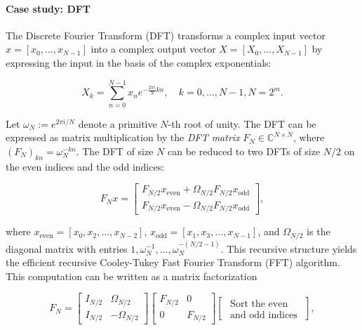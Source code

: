 \paragraph{Case study: DFT} The Discrete Fourier Transform (DFT) transforms a complex input vector $x = [x_0, \dots, x_{N-1}]$ into a complex output vector $X = [X_0, \dots, X_{N-1}]$ by expressing the input in the basis of the complex exponentials:

\begin{equation*}
  X_{k} = \sum_{n=0}^{N-1} x_n e^{-\frac{2\pi i}{N}kn}, \quad k = 0, \dots, N-1, N = 2^m.
\end{equation*}

Let $\omega_N := e^{2\pi i/N}$ denote a primitive $N$-th root of unity. The DFT can be expressed as matrix multiplication by the \emph{DFT matrix} $F_N \in \mathbb{C}^{N \times N}$, where $(F_N)_{kn} = \omega_N^{-kn}$. 
The DFT of size $N$ can be reduced to two DFTs of size $N/2$ on the even indices and the odd indices:

\begin{equation*}
  F_N x = \begin{bmatrix} F_{N/2} x_{\mathrm{even}} + \Omega_{N/2} F_{N/2} x_{\mathrm{odd}} \\ F_{N/2} x_{\mathrm{even}} - \Omega_{N/2} F_{N/2} x_{\mathrm{odd}} \end{bmatrix},
\end{equation*}

where $x_{\mathrm{even}} = \left[ x_0, x_2, \dots, x_{N-2} \right]$,
$x_{\mathrm{odd}} = \left[ x_1, x_3, \dots, x_{N-1} \right]$, and $\Omega_{N/2}$ is the diagonal matrix with entries $1, \omega_N^{-1}, \dots, \omega_N^{-(N/2 - 1)}$. This recursive structure yields the efficient recursive Cooley-Tukey Fast Fourier Transform (FFT) algorithm. This computation can be written as a matrix factorization

\begin{equation*}
  F_N = \begin{bmatrix} I_{N/2} & \Omega_{N/2} \\ I_{N/2} & -\Omega_{N/2} \end{bmatrix}
  \begin{bmatrix} F_{N/2} & 0 \\ 0 & F_{N/2} \end{bmatrix}
  \begin{bmatrix} \text{ Sort the even } \\ \text{ and odd indices } \end{bmatrix},
\end{equation*}

